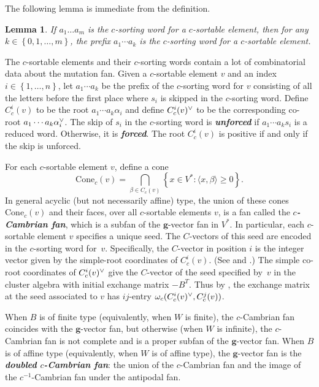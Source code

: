 \documentclass{amsart}
\newtheorem{lemma}[proposition]{Lemma}
\theoremstyle{definition}
\theoremstyle{remark}
\numberwithin{equation}{section}
\newcommand{\newword}[1]{\textbf{\emph{#1}}}
\newcommand{\set}[1]{{\left\lbrace #1 \right\rbrace}}
\newcommand{\br}[1]{{\langle #1 \rangle}}
\newcommand{\ck}{\spcheck}
\newcommand{\0}{{\mathbf{0}}}
\newcommand{\Cone}{\mathrm{Cone}}
\newcommand{\g}{\mathbf{g}}
\newcommand{\RSChar}{\Phi}
\newcommand{\RS}{\RSChar}
\begin{document}
The following lemma is immediate from the definition.
\begin{lemma}\label{any prefix}
If $a_1\ldots a_m$ is the $c$-sorting word for a $c$-sortable element, then for any $k\in\set{0,1,\ldots,m}$, the prefix $a_1\cdots a_k$ is the $c$-sorting word for a $c$-sortable element.
\end{lemma}


The $c$-sortable elements and their $c$-sorting words contain a lot of combinatorial data about the mutation fan.
Given a $c$-sortable element $v$ and an index $i\in\set{1,\ldots,n}$, let $a_1\cdots a_k$ be the prefix of the $c$-sorting word for $v$ consisting of all the letters before the first place where $s_i$ is skipped in the $c$-sorting word.
Define $C_c^i(v)$ to be the root $a_1\cdots a_k\alpha_i$ and define $C_c^i(v)\ck$ to be the corresponding co-root $a_1\cdots a_k\alpha\ck_i$.
The skip of $s_i$ in the $c$-sorting word is \newword{unforced} if $a_1\cdots a_ks_i$ is a reduced word.
Otherwise, it is \newword{forced}.
The root $C_c^i(v)$ is positive if and only if the skip is unforced.

For each $c$-sortable element $v$, define a cone  
\[\Cone_c(v)=\bigcap_{\beta \in C_c(v)}\set{x\in V^*:\br{x,\beta} \geq 0}.\]
In general acyclic (but not necessarily affine) type, the union of these cones $\Cone_c(v)$ and their faces, over all $c$-sortable elements $v$, is a fan called the \newword{$c$-Cambrian fan}, which is a subfan of the $\g$-vector fan in $V^*$.
In particular, each $c$-sortable element $v$ specifies a unique seed.
The $C$-vectors of this seed are encoded in the $c$-sorting word for~$v$.
Specifically, the $C$-vector in position $i$ is the integer vector given by the simple-root coordinates of $C_c^i(v)$.
(See \cite[Therem~1.1]{framework} and \cite[Theorem~5.12]{framework}.)
The simple co-root coordinates of $C_c^i(v)\ck$ give the $C$-vector of the seed specified by~$v$ in the cluster algebra with initial exchange matrix $-B^T$.
Thus by \cite[Theorem~1.1]{framework}, the exchange matrix at the seed associated to $v$ has $ij$-entry $\omega_c(C_c^i(v)\ck,C_c^j(v))$.

When $B$ is of finite type (equivalently, when $W$ is finite), the $c$-Cambrian fan coincides with the $\g$-vector fan, but otherwise (when $W$ is infinite), the $c$-Cambrian fan is not complete and is a proper subfan of the $\g$-vector fan.
When $B$ is of affine type (equivalently, when $W$ is of affine type), the $\g$-vector fan is the \newword{doubled $c$-Cambrian fan}: the union of the $c$-Cambrian fan and the image of the $c^{-1}$-Cambrian fan under the antipodal fan. %
\end{document}
